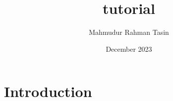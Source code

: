 \documentclass{article}
\title{tutorial}
\author{Mahmudur Rahman Tasin}
\date{December 2023}
\begin{document}
\maketitle

\section{Introduction}
\end{document}
